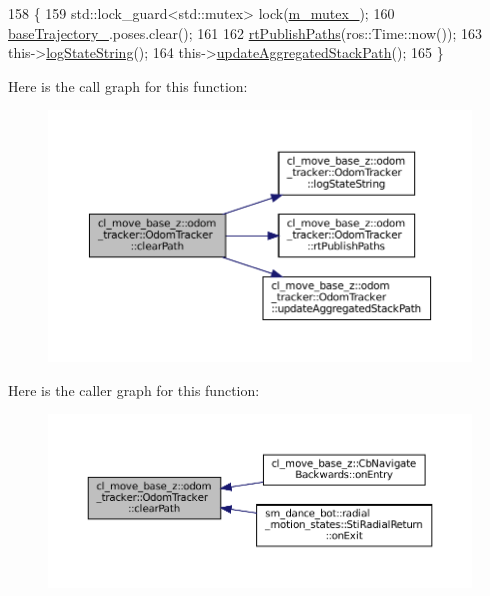 \begin{DoxyCode}
158         \{
159             std::lock\_guard<std::mutex> lock(\hyperlink{classcl__move__base__z_1_1odom__tracker_1_1OdomTracker_aa371639e1eee269273dec8d3ab9dba0f}{m\_mutex\_});
160             \hyperlink{classcl__move__base__z_1_1odom__tracker_1_1OdomTracker_a466d18a86df049f0f680e043bb5ea91f}{baseTrajectory\_}.poses.clear();
161 
162             \hyperlink{classcl__move__base__z_1_1odom__tracker_1_1OdomTracker_a8f728f85d1f3f49f4b94e37052a59d6d}{rtPublishPaths}(ros::Time::now());
163             this->\hyperlink{classcl__move__base__z_1_1odom__tracker_1_1OdomTracker_a6d0b450474d9d555205ff4281965164e}{logStateString}();
164             this->\hyperlink{classcl__move__base__z_1_1odom__tracker_1_1OdomTracker_a7922f1e1e688a2ed62d32d9914985a9f}{updateAggregatedStackPath}();
165         \}
\end{DoxyCode}
Here is the call graph for this function\+:
\nopagebreak
\begin{figure}[H]
\begin{center}
\leavevmode
\includegraphics[width=350pt]{classcl__move__base__z_1_1odom__tracker_1_1OdomTracker_a93a14e15e3e623f530e056f403bf7644_cgraph}
\end{center}
\end{figure}
Here is the caller graph for this function\+:
\nopagebreak
\begin{figure}[H]
\begin{center}
\leavevmode
\includegraphics[width=350pt]{classcl__move__base__z_1_1odom__tracker_1_1OdomTracker_a93a14e15e3e623f530e056f403bf7644_icgraph}
\end{center}
\end{figure}
